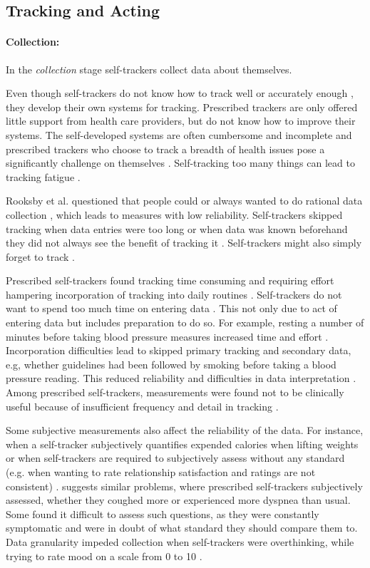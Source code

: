 \subsection{Tracking and Acting}					
\paragraph{Collection:}
In the \textit{collection} stage self-trackers collect data about themselves. 

Even though self-trackers do not know how to track well or accurately enough \citep{Chung2015, Patel2012}, they develop their own systems for tracking. Prescribed trackers are only offered little support from health care providers, but do not know how to improve their systems. The self-developed systems are often cumbersome and incomplete and prescribed trackers who choose to track a breadth of health issues pose a significantly challenge on themselves \citep{Patel2012}. Self-tracking too many things can lead to tracking fatigue \citep{Choe2014}. 

Rooksby et al. questioned that people could or always wanted to do rational data collection \citep{Rooksby2014}, which leads to measures with low reliability. Self-trackers skipped tracking when data entries were too long or when data was known beforehand they did not always see the benefit of tracking it \citep{Epstein2015}. Self-trackers might also simply forget to track \citep{Li2010}. 

Prescribed self-trackers found tracking time consuming and requiring effort \citep{Ancker2015} hampering incorporation of tracking into daily routines \citep{Verdezoto2015, Ancker2015}. Self-trackers do not want to spend too much time on entering data \citep{Choe2013, Li2010}. This not only due to act of entering data but includes preparation to do so. For example, resting a number of minutes before taking blood pressure measures increased time and effort \citep{Verdezoto2015}. Incorporation difficulties lead to skipped primary tracking and secondary data, e.g, whether guidelines had been followed by  smoking before taking a blood pressure reading. This reduced reliability and difficulties in data interpretation \citep{Verdezoto2015}. Among prescribed self-trackers, measurements were found not to be clinically useful because of insufficient frequency and detail in tracking \citep{Chung2015}. 

Some subjective measurements also affect the reliability of the data. For instance, when a self-tracker subjectively quantifies expended calories when lifting weights or when self-trackers are required to subjectively assess without any standard (e.g. when wanting to rate relationship satisfaction and ratings are not consistent) \citep{Li2010}. \citep{piloting} suggests similar problems, where prescribed self-trackers subjectively assessed, whether they coughed more or experienced more dyspnea than usual. Some found it difficult to assess such questions, as they were constantly symptomatic and were in doubt of what standard they should compare them to. Data granularity impeded collection when self-trackers were overthinking, while trying to rate mood on a scale from 0 to 10 \citep{Oh2015}. 

